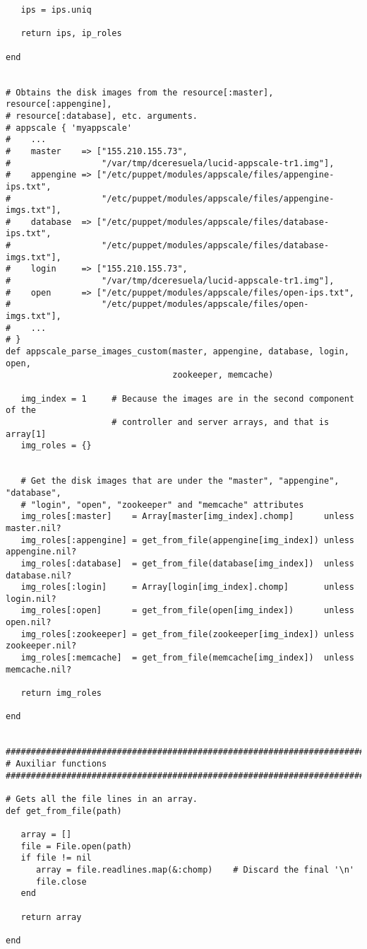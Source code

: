 \begin{lstlisting}
   ips = ips.uniq
   
   return ips, ip_roles
   
end


# Obtains the disk images from the resource[:master], resource[:appengine],
# resource[:database], etc. arguments.
# appscale { 'myappscale'
#    ...
#    master    => ["155.210.155.73",
#                  "/var/tmp/dceresuela/lucid-appscale-tr1.img"],
#    appengine => ["/etc/puppet/modules/appscale/files/appengine-ips.txt",
#                  "/etc/puppet/modules/appscale/files/appengine-imgs.txt"],
#    database  => ["/etc/puppet/modules/appscale/files/database-ips.txt",
#                  "/etc/puppet/modules/appscale/files/database-imgs.txt"],
#    login     => ["155.210.155.73",
#                  "/var/tmp/dceresuela/lucid-appscale-tr1.img"],
#    open      => ["/etc/puppet/modules/appscale/files/open-ips.txt",
#                  "/etc/puppet/modules/appscale/files/open-imgs.txt"],
#    ...
# }
def appscale_parse_images_custom(master, appengine, database, login, open,
                                 zookeeper, memcache)

   img_index = 1     # Because the images are in the second component of the
                     # controller and server arrays, and that is array[1]
   img_roles = {}

   
   # Get the disk images that are under the "master", "appengine", "database",
   # "login", "open", "zookeeper" and "memcache" attributes
   img_roles[:master]    = Array[master[img_index].chomp]      unless master.nil?
   img_roles[:appengine] = get_from_file(appengine[img_index]) unless appengine.nil?
   img_roles[:database]  = get_from_file(database[img_index])  unless database.nil?
   img_roles[:login]     = Array[login[img_index].chomp]       unless login.nil?
   img_roles[:open]      = get_from_file(open[img_index])      unless open.nil?
   img_roles[:zookeeper] = get_from_file(zookeeper[img_index]) unless zookeeper.nil?
   img_roles[:memcache]  = get_from_file(memcache[img_index])  unless memcache.nil?

   return img_roles
   
end


################################################################################
# Auxiliar functions
################################################################################

# Gets all the file lines in an array.
def get_from_file(path)

   array = []
   file = File.open(path)
   if file != nil
      array = file.readlines.map(&:chomp)    # Discard the final '\n'
      file.close
   end

   return array

end
\end{lstlisting}


